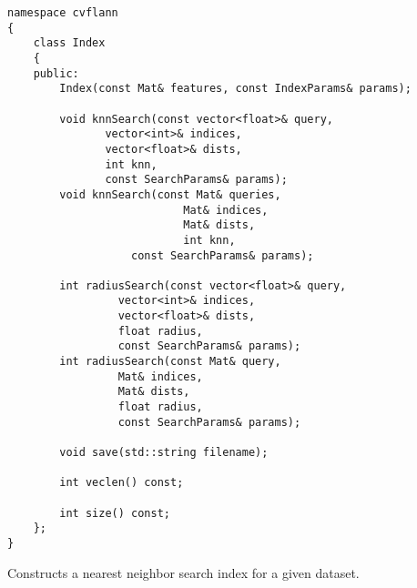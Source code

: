 \begin{lstlisting}
namespace cvflann
{
    class Index 
    {
    public:
	    Index(const Mat& features, const IndexParams& params);

	    void knnSearch(const vector<float>& query, 
			   vector<int>& indices, 
			   vector<float>& dists, 
			   int knn, 
			   const SearchParams& params);
	    void knnSearch(const Mat& queries, 
                           Mat& indices, 
                           Mat& dists, 
                           int knn, 
		           const SearchParams& params);

	    int radiusSearch(const vector<float>& query, 
			     vector<int>& indices, 
			     vector<float>& dists, 
			     float radius, 
			     const SearchParams& params);
	    int radiusSearch(const Mat& query, 
			     Mat& indices, 
			     Mat& dists, 
			     float radius, 
			     const SearchParams& params);

	    void save(std::string filename);

	    int veclen() const;

	    int size() const;
    };
}
\end{lstlisting}

Constructs a nearest neighbor search index for a given dataset.

